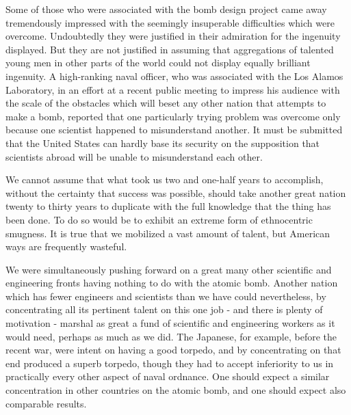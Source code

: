 Some of those who were associated with the bomb design project came away tremendously impressed with the seemingly insuperable difficulties which were overcome. Undoubtedly they were justified in their admiration for the ingenuity displayed. But they are not justified in assuming that aggregations of talented young men in other parts of the world could not display equally brilliant ingenuity. A high-ranking naval officer, who was associated with the Los Alamos Laboratory, in an effort at a recent public meeting to impress his audience with the scale of the obstacles which will beset any other nation that attempts to make a bomb, reported that one particularly trying problem was overcome only because one scientist happened to misunderstand another. It must be submitted that the United States can hardly base its security on the supposition that scientists abroad will be unable to misunderstand each other.

We cannot assume that what took us two and one-half years to accomplish, without the certainty that success was possible, should take another great nation twenty to thirty years to duplicate with the full knowledge that the thing has been done. To do so would be to exhibit an extreme form of ethnocentric smugness. It is true that we mobilized a vast amount of talent, but American ways are frequently wasteful.

We were simultaneously pushing forward on a great many other scientific and engineering fronts having nothing to do with the atomic bomb. Another nation which has fewer engineers and scientists than we have could nevertheless, by concentrating all its pertinent talent on this one job - and there is plenty of motivation - marshal as great a fund of scientific and engineering workers as it would need, perhaps as much as we did. The Japanese, for example, before the recent war, were intent on having a good torpedo, and by concentrating on that end produced a superb torpedo, though they had to accept inferiority to us in practically every other aspect of naval ordnance. One should expect a similar concentration in other countries on the atomic bomb, and one should expect also comparable results.

